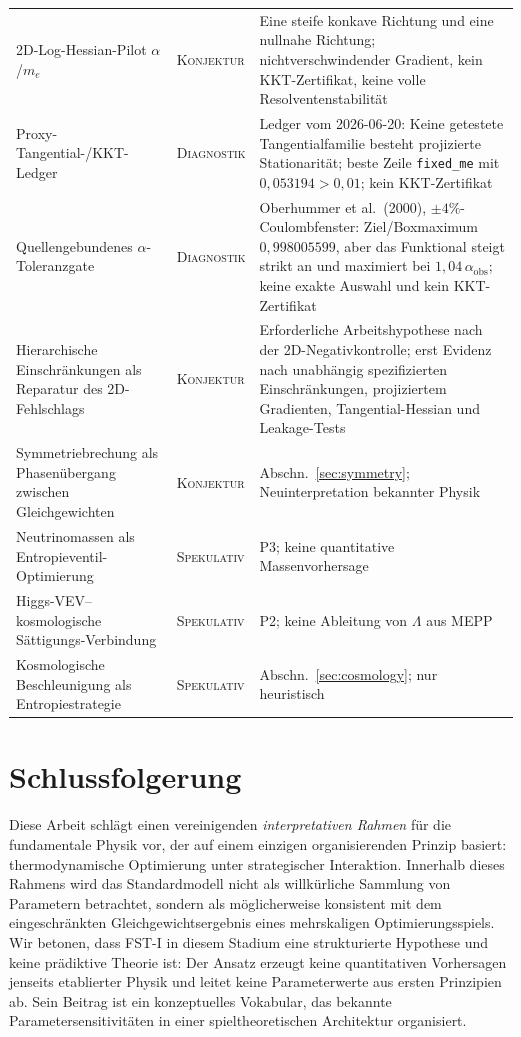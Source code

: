 \documentclass[12pt,a4paper]{article}
\theoremstyle{remark}
\begin{document}
\begin{table}[htbp]
\begin{tabularx}{\textwidth}{@{}>{\raggedright\arraybackslash}p{4.0cm}>{\raggedright\arraybackslash}p{2.7cm}Y@{}}
2D-Log-Hessian-Pilot $\alpha$/$m_e$ & \textsc{Konjektur} & Eine steife konkave Richtung und eine nullnahe Richtung; nichtverschwindender Gradient, kein KKT-Zertifikat, keine volle Resolventenstabilit\"at \\
Proxy-Tangential-/KKT-Ledger & \textsc{Diagnostik} & Ledger vom 2026-06-20: Keine getestete Tangentialfamilie besteht projizierte Stationarit\"at; beste Zeile \texttt{fixed\_me} mit $0{,}053194>0{,}01$; kein KKT-Zertifikat \\
Quellengebundenes $\alpha$-Toleranzgate & \textsc{Diagnostik} & Oberhummer et al.\ (2000), $\pm4\%$-Coulombfenster: Ziel/Boxmaximum $0{,}998005599$, aber das Funktional steigt strikt an und maximiert bei $1{,}04\,\alpha_{\mathrm{obs}}$; keine exakte Auswahl und kein KKT-Zertifikat \\
Hierarchische Einschr\"ankungen als Reparatur des 2D-Fehlschlags & \textsc{Konjektur} & Erforderliche Arbeitshypothese nach der 2D-Negativkontrolle; erst Evidenz nach unabh\"angig spezifizierten Einschr\"ankungen, projiziertem Gradienten, Tangential-Hessian und Leakage-Tests \\
Symmetriebrechung als Phasen\"ubergang zwischen Gleichgewichten & \textsc{Konjektur} & Abschn.~\ref{sec:symmetry}; Neuinterpretation bekannter Physik \\
Neutrinomassen als Entropieventil-Optimierung & \textsc{Spekulativ} & P3; keine quantitative Massenvorhersage \\
Higgs-VEV--kosmologische S\"attigungs-Verbindung & \textsc{Spekulativ} & P2; keine Ableitung von $\Lambda$ aus MEPP \\
Kosmologische Beschleunigung als Entropiestrategie & \textsc{Spekulativ} & Abschn.~\ref{sec:cosmology}; nur heuristisch \\
\bottomrule
\end{tabularx}
\end{table}

\section{Schlussfolgerung}
\label{sec:conclusion}

Diese Arbeit schl\"agt einen vereinigenden \emph{interpretativen Rahmen} f\"ur die fundamentale Physik vor, der auf einem einzigen organisierenden Prinzip basiert: thermodynamische Optimierung unter strategischer Interaktion. Innerhalb dieses Rahmens wird das Standardmodell nicht als willk\"urliche Sammlung von Parametern betrachtet, sondern als m\"oglicherweise konsistent mit dem eingeschr\"ankten Gleichgewichtsergebnis eines mehrskaligen Optimierungsspiels. Wir betonen, dass FST-I in diesem Stadium eine strukturierte Hypothese und keine pr\"adiktive Theorie ist: Der Ansatz erzeugt keine quantitativen Vorhersagen jenseits etablierter Physik und leitet keine Parameterwerte aus ersten Prinzipien ab. Sein Beitrag ist ein konzeptuelles Vokabular, das bekannte Parametersensitivit\"aten in einer spieltheoretischen Architektur organisiert.
\end{document}
